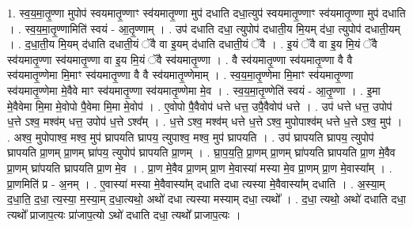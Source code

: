 \documentclass[17pt]{extarticle}
\begin{document}
1. स्व॒य॒मा॒तृ॒ण्णा मुपोप॑ स्वयमातृ॒ण्णाꣳ स्व॑यमातृ॒ण्णा मुप॑ दधाति दधा॒त्युप॑ स्वयमातृ॒ण्णाꣳ स्व॑यमातृ॒ण्णा मुप॑ दधाति । . स्व॒य॒मा॒तृ॒ण्णामिति॑ स्वयं - आ॒तृ॒ण्णाम् । . उप॑ दधाति दधा॒ त्युपोप॑ दधाती॒य मि॒यम् द॑धा॒ त्युपोप॑ दधाती॒यम् । . द॒धा॒ती॒य मि॒यम् द॑धाति दधाती॒यं ॅवै वा इ॒यम् द॑धाति दधाती॒यं ॅवै । . इ॒यं ॅवै वा इ॒य मि॒यं ॅवै स्व॑यमातृ॒ण्णा स्व॑यमातृ॒ण्णा वा इ॒य मि॒यं ॅवै स्व॑यमातृ॒ण्णा । . वै स्व॑यमातृ॒ण्णा स्व॑यमातृ॒ण्णा वै वै स्व॑यमातृ॒ण्णेमा मि॒माꣳ स्व॑यमातृ॒ण्णा वै वै स्व॑यमातृ॒ण्णेमाम् । . स्व॒य॒मा॒तृ॒ण्णेमा मि॒माꣳ स्व॑यमातृ॒ण्णा स्व॑यमातृ॒ण्णेमा मे॒वैवे माꣳ स्व॑यमातृ॒ण्णा स्व॑यमातृ॒ण्णेमा मे॒व । . स्व॒य॒मा॒तृ॒ण्णेति॑ स्वयं - आ॒तृ॒ण्णा । . इ॒मा मे॒वैवेमा मि॒मा मे॒वोपो पै॒वेमा मि॒मा मे॒वोप॑ । . ए॒वोपो पै॒वैवोप॑ धत्ते धत्त॒ उपै॒वैवोप॑ धत्ते । . उप॑ धत्ते धत्त॒ उपोप॑ ध॒त्ते ऽश्व॒ मश्व॑म् धत्त॒ उपोप॑ ध॒त्ते ऽश्व᳚म् । . ध॒त्ते ऽश्व॒ मश्व॑म् धत्ते ध॒त्ते ऽश्व॒ मुपोपाश्व॑म् धत्ते ध॒त्ते ऽश्व॒ मुप॑ । . अश्व॒ मुपोपाश्व॒ मश्व॒ मुप॑ घ्रापयति घ्रापय॒ त्युपाश्व॒ मश्व॒ मुप॑ घ्रापयति । . उप॑ घ्रापयति घ्रापय॒ त्युपोप॑ घ्रापयति प्रा॒णम् प्रा॒णम् घ्रा॑पय॒ त्युपोप॑ घ्रापयति प्रा॒णम् । . घ्रा॒प॒य॒ति॒ प्रा॒णम् प्रा॒णम् घ्रा॑पयति घ्रापयति प्रा॒ण मे॒वैव प्रा॒णम् घ्रा॑पयति घ्रापयति प्रा॒ण मे॒व । . प्रा॒ण मे॒वैव प्रा॒णम् प्रा॒ण मे॒वास्या॑ मस्या मे॒व प्रा॒णम् प्रा॒ण मे॒वास्या᳚म् । . प्रा॒णमिति॑ प्र - अ॒नम् । . ए॒वास्या॑ मस्या मे॒वैवास्या᳚म् दधाति दधा त्यस्या मे॒वैवास्या᳚म् दधाति । . अ॒स्या॒म् द॒धा॒ति॒ द॒धा॒ त्य॒स्या॒ म॒स्या॒म् द॒धा॒त्यथो॒ अथो॑ दधा त्यस्या मस्याम् दधा॒ त्यथो᳚ । . द॒धा॒ त्यथो॒ अथो॑ दधाति दधा॒ त्यथो᳚ प्राजाप॒त्यः प्रा॑जाप॒त्यो ऽथो॑ दधाति दधा॒ त्यथो᳚ प्राजाप॒त्यः । \newline
\end{document}
